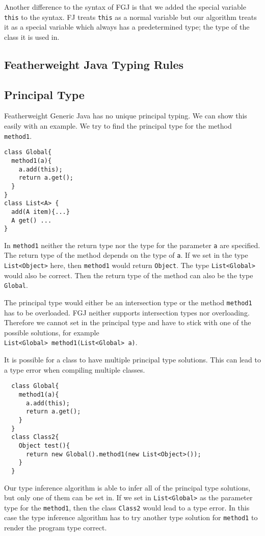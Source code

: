 Another difference to the syntax of FGJ is that we added the special variable \texttt{this} to the syntax.
FJ treats \texttt{this} as a normal variable
but our algorithm treats it as a special variable which always has a predetermined type;
the type of the class it is used in.

\subsection{Featherweight Java Typing Rules}\label{chapter:type-rules}


\subsection{Principal Type}
Featherweight Generic Java has no unique principal typing.
We can show this easily with an example.
We try to find the principal type for the method \texttt{method1}.
\begin{lstlisting}
class Global{
  method1(a){
    a.add(this);
    return a.get();
  }
}
class List<A> {
  add(A item){...}
  A get() ...
}
\end{lstlisting}
In \texttt{method1} neither the return type nor the type for the parameter \texttt{a} are specified.
The return type of the method depends on the type of \texttt{a}.
If we set in the type \texttt{List<Object>} here, then \texttt{method1} would return \texttt{Object}.
The type \texttt{List<Global>} would also be correct.
Then the return type of the method can also be the type \texttt{Global}.

The principal type would either be an intersection type or the method \texttt{method1} has to be overloaded.
FGJ neither supports intersection types nor overloading.
Therefore we cannot set in the principal type and have to stick with one of the possible solutions,
for example\\
\texttt{List<Global> method1(List<Global> a)}.

It is possible for a class to have multiple principal type solutions.
This can lead to a type error when compiling multiple classes.
\begin{lstlisting}
  class Global{
    method1(a){
      a.add(this);
      return a.get();
    }
  }
  class Class2{
    Object test(){
      return new Global().method1(new List<Object>());
    }
  }
\end{lstlisting}
Our type inference algorithm is able to infer all of the principal type solutions, but only one of them can be set in.
If we set in \texttt{List<Global>} as the parameter type for the \texttt{method1},
then the class \texttt{Class2} would lead to a type error.
In this case the type inference algorithm has to try another type solution for \texttt{method1}
to render the program type correct.

